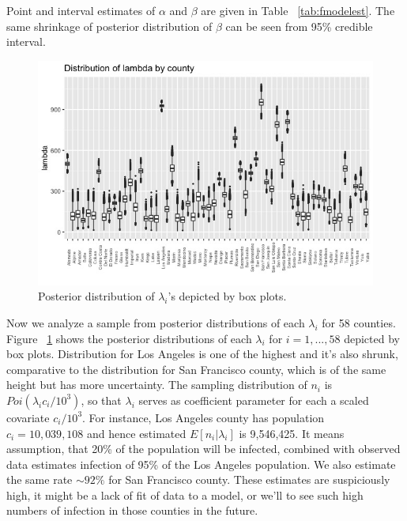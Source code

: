 \documentclass[11pt,twocolumn]{asaproc}
\begin{document}
Point and interval estimates of $\alpha$ and $\beta$ are given in Table ~\ref{tab:fmodelest}. The same shrinkage of posterior distribution of $\beta$ can be seen from 95\% credible interval.

\begin{figure}[t]
\centering\includegraphics[scale=.31]{lambdas.jpeg}
\caption{Posterior distribution of $\lambda_i$'s depicted by box plots.}
\label{fig:lambdas}
\end{figure}

Now we analyze a sample from posterior distributions of each $\lambda_i$ for 58 counties. Figure ~\ref{fig:lambdas} shows the posterior distributions of each $\lambda_i$ for $i = 1, ..., 58$ depicted by box plots. Distribution for Los Angeles is one of the highest and it's also shrunk, comparative to the distribution for San Francisco county, which is of the same height but has more uncertainty. The sampling distribution of $n_i$ is $Poi(\lambda_i c_i / 10^3)$, so that $\lambda_i$ serves as coefficient parameter for each a scaled covariate $c_i/10^3$. For instance, Los Angeles county has population $c_i = 10,039,108$ and hence estimated $E[n_i|\lambda_i]$ is 9,546,425. It means assumption, that 20\% of the population will be infected, combined with observed data estimates infection of 95\% of the Los Angeles population. We also estimate the same rate $\sim 92\%$ for San Francisco county. These estimates are suspiciously high, it might be a lack of fit of data to a model, or we'll to see such high numbers of infection in those counties in the future.
\end{document}
